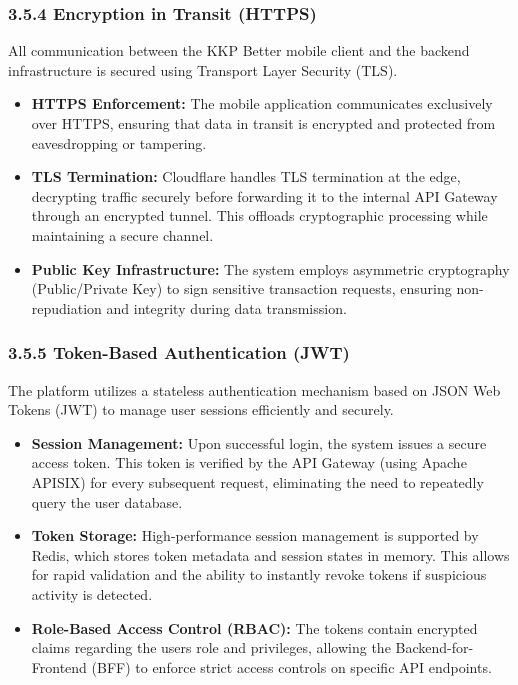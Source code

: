 \subsubsection{\texorpdfstring{\textbf{3.5.4 Encryption in Transit
(HTTPS)}}{3.5.4 Encryption in Transit (HTTPS)}}\label{encryption-in-transit-https}

All communication between the KKP Better mobile client and the backend
infrastructure is secured using Transport Layer Security (TLS).

\begin{itemize}
\item
  \textbf{HTTPS Enforcement:} The mobile application communicates
  exclusively over HTTPS, ensuring that data in transit is encrypted and
  protected from eavesdropping or tampering.
\item
  \textbf{TLS Termination:} Cloudflare handles TLS termination at the
  edge, decrypting traffic securely before forwarding it to the internal
  API Gateway through an encrypted tunnel. This offloads cryptographic
  processing while maintaining a secure channel.
\item
  \textbf{Public Key Infrastructure:} The system employs asymmetric
  cryptography (Public/Private Key) to sign sensitive transaction
  requests, ensuring non-repudiation and integrity during data
  transmission.
\end{itemize}

\subsubsection{\texorpdfstring{\textbf{3.5.5 Token-Based Authentication
(JWT)}}{3.5.5 Token-Based Authentication (JWT)}}\label{token-based-authentication-jwt}

The platform utilizes a stateless authentication mechanism based on JSON
Web Tokens (JWT) to manage user sessions efficiently and securely.

\begin{itemize}
\item
  \textbf{Session Management:} Upon successful login, the system issues
  a secure access token. This token is verified by the API Gateway
  (using Apache APISIX) for every subsequent request, eliminating the
  need to repeatedly query the user database.
\item
  \textbf{Token Storage:} High-performance session management is
  supported by Redis, which stores token metadata and session states in
  memory. This allows for rapid validation and the ability to instantly
  revoke tokens if suspicious activity is detected.
\item
  \textbf{Role-Based Access Control (RBAC):} The tokens contain
  encrypted claims regarding the user\textquotesingle s role and
  privileges, allowing the Backend-for-Frontend (BFF) to enforce strict
  access controls on specific API endpoints.
\end{itemize}

